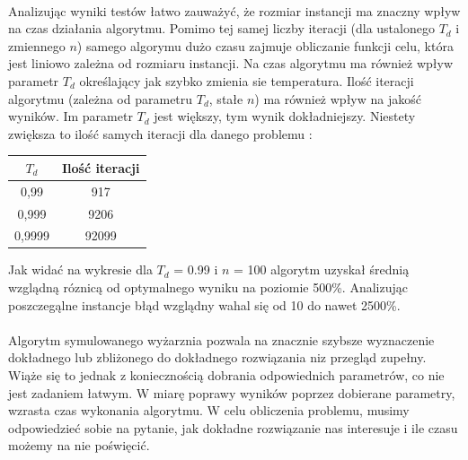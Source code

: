 \documentclass[wide,a4paper,titlepage,12pt] {article}
\begin{document}
\paragraph{}
Analizując wyniki testów łatwo zauważyć, że rozmiar instancji ma znaczny wpływ na czas działania algorytmu. Pomimo tej samej liczby iteracji (dla ustalonego $T_d$ i zmiennego $n$) samego algorymu dużo czasu zajmuje obliczanie funkcji celu, która jest liniowo zależna od rozmiaru instancji. Na czas algorytmu ma również wpływ parametr $T_{d}$ określający jak szybko zmienia sie temperatura. Ilość iteracji algorytmu (zależna od parametru $T_d$, stałe $n$) ma również wpływ na jakość wyników. Im parametr $T_d$ jest większy, tym wynik dokładniejszy. Niestety zwiększa to ilość samych iteracji dla danego problemu : \\
\begin{center}
    \begin{tabular}{|c|c|}
      \hline
       $T_{d}$ & Ilość iteracji \\ \hline
       0,99 & 917 \\ \hline
       0,999 & 9206 \\ \hline
       0,9999 & 92099  \\ \hline
  \end{tabular}
\end{center}
Jak widać na wykresie dla $T_d$ = 0.99 i $n$ = 100 algorytm uzyskał średnią wzglądną róznicą od optymalnego wyniku na poziomie 500\%. Analizując poszczegąlne instancje błąd wzglądny wahal się od 10 do nawet 2500\%.
\paragraph{}
Algorytm symulowanego wyżarznia pozwala na znacznie szybsze wyznaczenie dokładnego lub zbliżonego do dokładnego rozwiązania niz przegląd zupełny. Wiąże się to jednak z koniecznością dobrania odpowiednich parametrów, co nie jest zadaniem łatwym. W miarę poprawy wyników poprzez dobierane parametry, wzrasta czas wykonania algorytmu. W celu obliczenia problemu, musimy odpowiedzieć sobie na pytanie, jak dokładne rozwiązanie nas interesuje i ile czasu możemy na nie poświęcić.  
\end{document}
